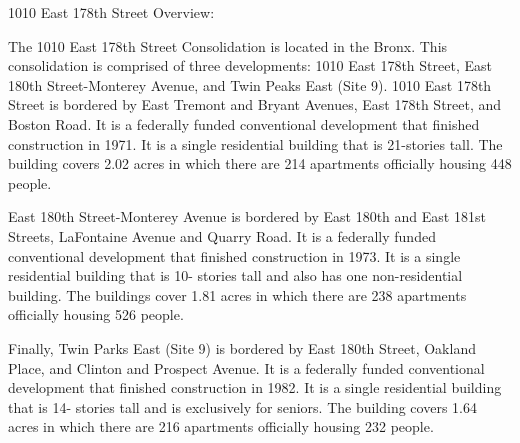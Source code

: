 1010 East 178th Street Overview:      

    

The 1010 East 178th Street Consolidation is located in the Bronx. This consolidation is comprised of three developments: 1010 East 178th Street, East 180th Street-Monterey Avenue, and Twin Peaks East (Site 9). 1010 East 178th Street is bordered by East Tremont and Bryant Avenues, East 178th Street, and Boston Road. It is a federally funded conventional development that finished construction in 1971. It is a single residential building that is 21-stories tall. The building covers 2.02 acres in which there are 214 apartments officially housing 448 people.  

East 180th Street-Monterey Avenue is bordered by East 180th and East 181st Streets, LaFontaine Avenue and Quarry Road. It is a federally funded conventional development that finished construction in 1973. It is a single residential building that is 10- stories tall and also has one non-residential building. The buildings cover 1.81 acres in which there are 238 apartments officially housing 526 people.  

Finally, Twin Parks East (Site 9) is bordered by East 180th Street, Oakland Place, and Clinton and Prospect Avenue. It is a federally funded conventional development that finished construction in 1982. It is a single residential building that is 14- stories tall and is exclusively for seniors. The building covers 1.64 acres in which there are 216 apartments officially housing 232 people.  